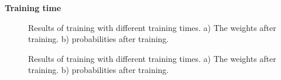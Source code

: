 \documentclass[10pt,a4paper]{article}
\begin{document}
\textbf{Training time}

\begin{figure}[H]
    \centering
    \qquad
    \caption{Results of training with different training times. a) The weights after training. b) probabilities after training.}
    \label{fig:off_line_learning_training_time}%
\end{figure}

\begin{figure}[H]
    \centering
    \qquad
    \caption{Results of training with different training times. a) The weights after training. b) probabilities after training.}
    \label{fig:off_line_learning_training_time2}%
\end{figure}
\end{document}
